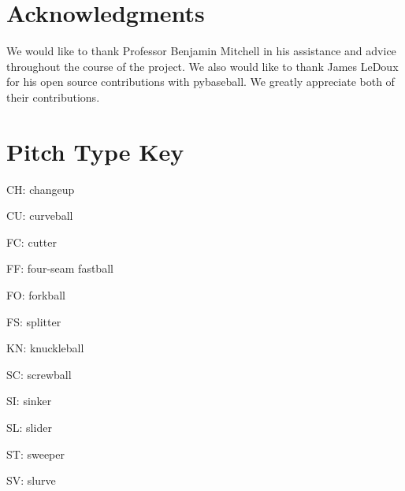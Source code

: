 \documentclass{article}
\begin{document}
\section*{Acknowledgments}

We would like to thank Professor Benjamin Mitchell in his assistance and advice throughout the course 
of the project. We also would like to thank James LeDoux for his open source contributions with 
pybaseball. We greatly appreciate both of their contributions.


 
\nocite{baseballsavant.com}


\newpage

\section*{Pitch Type Key}
\label{key} 
CH: changeup

CU: curveball

FC: cutter

FF: four-seam fastball

FO: forkball

FS: splitter

KN: knuckleball

SC: screwball

SI: sinker

SL: slider

ST: sweeper

SV: slurve
\end{document}
